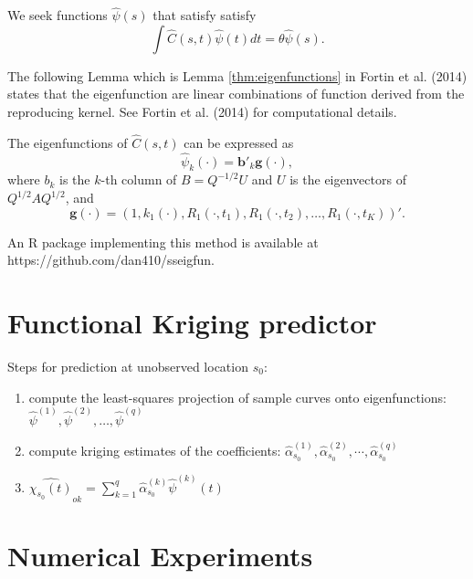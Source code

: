 We seek functions $\hat{\psi}(s)$ that satisfy satisfy 
\begin{equation}
	\label{eq:eigenfuns} \int \hat{C}(s,t)\hat{\psi}(t)dt=\theta\hat{\psi}(s). 
\end{equation}

The following Lemma which is Lemma \ref{thm:eigenfunctions} in Fortin et al. (2014) states that the eigenfunction are linear combinations of function derived from the reproducing kernel. See Fortin et al. (2014) for computational details.
\begin{lemma}
	\label{thm:eigenfunctions} The eigenfunctions of $\hat{C}(s,t)$ can be expressed as 
	\begin{equation*}
		\hat{\psi}_k(\cdot) = \mathbf{b}'_k\mathbf{g}(\cdot), 
	\end{equation*}
	where $b_k$ is the $k$-th column of $B=Q^{-1/2}U$ and $U$ is the eigenvectors of $Q^{1/2}AQ^{1/2}$, and
	\[ \mathbf{g(\cdot)}=(1, k_1(\cdot),R_{1}(\cdot, t_1),R_{1}(\cdot, t_2),\dots, R_{1}(\cdot, t_K))'. \]
\end{lemma}
An R package implementing this method is available at https://github.com/dan410/sseigfun.


\section{Functional Kriging predictor} 

\label{sec:functional_kriging_predictor}

Steps for prediction at unobserved location $s_0$: 
\begin{enumerate}
	\item compute the least-squares projection of sample curves onto eigenfunctions: $\hat{\psi}^{(1)}, \hat{\psi}^{(2)}, \dots, \hat{\psi}^{(q)}$ 
	\item compute kriging estimates of the coefficients: $\hat{\alpha}_{s_0}^{(1)}, \hat{\alpha}_{s_0}^{(2)}, \cdots, \hat{\alpha}_{s_0}^{(q)}$ 
	\item $\widehat{\chi_{s_0}(t)}_{ok} = \sum_{k=1}^{q} \hat{\alpha}_{s_0}^{(k)}\hat{\psi}^{(k)}(t)$ 
	
\end{enumerate}


\section{Numerical Experiments} 

